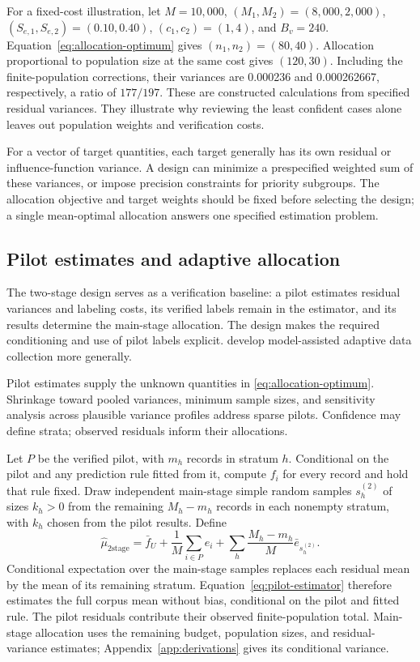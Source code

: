 \documentclass[11pt,a4paper]{article}
\begin{document}
For a fixed-cost illustration, let $M=10{,}000$, $(M_1,M_2)=(8{,}000,2{,}000)$, $(S_{e,1},S_{e,2})=(0.10,0.40)$, $(c_1,c_2)=(1,4)$, and $B_v=240$. Equation~\eqref{eq:allocation-optimum} gives $(n_1,n_2)=(80,40)$. Allocation proportional to population size at the same cost gives $(120,30)$. Including the finite-population corrections, their variances are 0.000236 and 0.000262667, respectively, a ratio of $177/197$. These are constructed calculations from specified residual variances. They illustrate why reviewing the least confident cases alone leaves out population weights and verification costs.

For a vector of target quantities, each target generally has its own residual or influence-function variance. A design can minimize a prespecified weighted sum of these variances, or impose precision constraints for priority subgroups. The allocation objective and target weights should be fixed before selecting the design; a single mean-optimal allocation answers one specified estimation problem.

\subsection{Pilot estimates and adaptive allocation}\label{sec:pilot-allocation}

The two-stage design serves as a verification baseline: a pilot estimates residual variances and labeling costs, its verified labels remain in the estimator, and its results determine the main-stage allocation. The design makes the required conditioning and use of pilot labels explicit. \citet{zrnic2024} develop model-assisted adaptive data collection more generally.

Pilot estimates supply the unknown quantities in \eqref{eq:allocation-optimum}. Shrinkage toward pooled variances, minimum sample sizes, and sensitivity analysis across plausible variance profiles address sparse pilots. Confidence may define strata; observed residuals inform their allocations.

Let $P$ be the verified pilot, with $m_h$ records in stratum $h$. Conditional on the pilot and any prediction rule fitted from it, compute $f_i$ for every record and hold that rule fixed. Draw independent main-stage simple random samples $s_h^{(2)}$ of sizes $k_h>0$ from the remaining $M_h-m_h$ records in each nonempty stratum, with $k_h$ chosen from the pilot results. Define
\begin{equation}
 \widehat\mu_{\mathrm{2stage}}=\bar f_U
   +\frac{1}{M}\sum_{i\in P}e_i
   +\sum_h\frac{M_h-m_h}{M}\bar e_{s_h^{(2)}}.
 \label{eq:pilot-estimator}
\end{equation}
Conditional expectation over the main-stage samples replaces each residual mean by the mean of its remaining stratum. Equation~\eqref{eq:pilot-estimator} therefore estimates the full corpus mean without bias, conditional on the pilot and fitted rule. The pilot residuals contribute their observed finite-population total. Main-stage allocation uses the remaining budget, population sizes, and residual-variance estimates; Appendix~\ref{app:derivations} gives its conditional variance.
\end{document}
